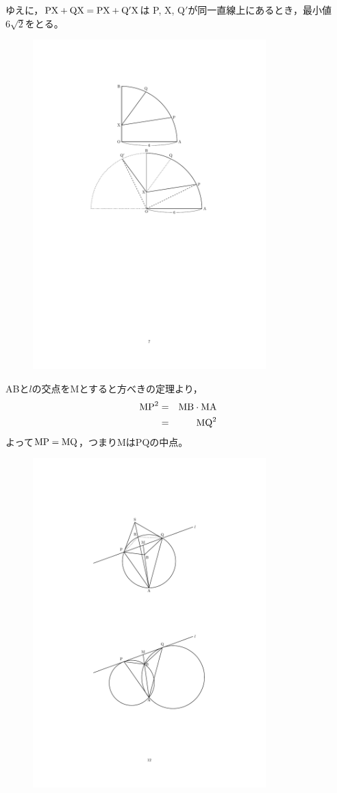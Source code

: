 \documentclass[a4paper,12pt,uplatex]{jsarticle}  %
\begin{document}
ゆえに，$\rm PX+QX = PX+Q'X$は P, X, Q$'$が同一直線上にあるとき，最小値$6\sqrt 2$をとる。
\begin{figure}[ht]
  \centering
  \includegraphics[width=9.0cm]{toujitsu_6_solution.pdf}
\end{figure}



ABと$l$の交点をMとすると方べきの定理より，
\begin{eqnarray*}
{\rm MP}^{2} &=& {\rm MB}\cdot {\rm MA}\\
&=& {\rm MQ}^{2}\\
\end{eqnarray*}
よって${\rm MP} = {\rm MQ}$，つまりMはPQの中点。

\begin{figure}[ht]
  \centering
  \includegraphics[width=9.0cm]{toujitsu_7_solution_1.pdf}
\end{figure}
\end{document}
